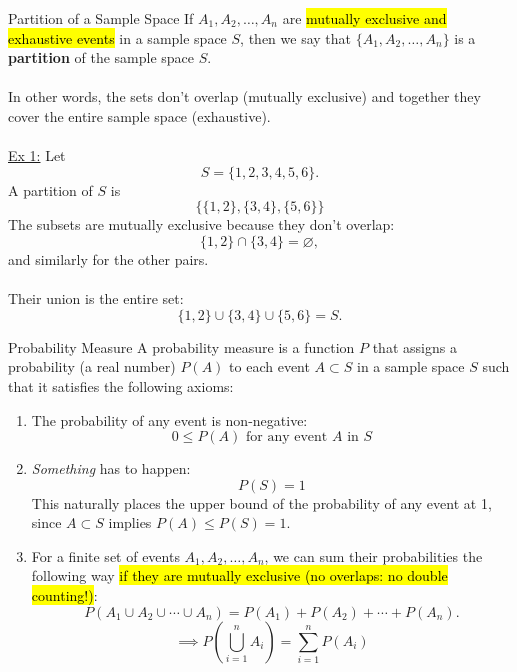 ﻿\documentclass[12pt]{article}
\begin{document}
\begin{definition}{Partition of a Sample Space}
    If $A_1, A_2, \ldots, A_n$ are \hl{mutually exclusive and exhaustive events} in a sample space $S$, then we say that $\{A_1, A_2, \ldots, A_n\}$ is a \textbf{partition} of the sample space $S$.\\\\
    In other words, the sets don't overlap (mutually exclusive) and together they cover the entire sample space (exhaustive).\\\\
    \underline{Ex 1:} Let
\[
S=\{1,2,3,4,5,6\}.
\]
A partition of \(S\) is
\[
\big\{\{1,2\},\{3,4\},\{5,6\}\big\}
\]
The subsets are mutually exclusive because they don't overlap:
\[
\{1,2\}\cap\{3,4\}=\varnothing,
\]
and similarly for the other pairs.\\\\
Their union is the entire set:
\[
\{1,2\}\cup\{3,4\}\cup\{5,6\}=S.
\]
\end{definition}

\begin{definition}{Probability Measure}
    A probability measure is a function $P$ that assigns a probability (a real number) $P(A)$ to each event $A\subset S$ in a sample space $S$ such that it satisfies the following axioms:
    \begin{enumerate}
        \item The probability of any event is non-negative:
        \[0 \leq P(A) \text{  for any event  } A \text{ in } S\]
        \item \textit{Something} has to happen:
        $$P(S) = 1$$
        This naturally places the upper bound of the probability of any event at 1, since $A\subset S$ implies $P(A)\leq P(S)=1$.
        \item For a finite set of events $A_1, A_2, \ldots, A_n$, we can sum their probabilities the following way \hl{if they are mutually exclusive (no overlaps: no double counting!)}:
        \[
        P(A_1 \cup A_2 \cup \cdots \cup A_n) = P(A_1) + P(A_2) + \cdots + P(A_n).
        \]
        \[\implies P \left(\bigcup_{i=1}^{n} A_i\right) = \sum_{i=1}^{n} P(A_i)\]
    \end{enumerate}
\end{definition}
\end{document}

